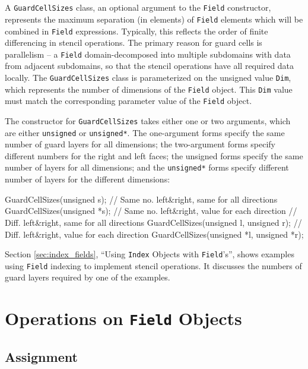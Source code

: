 \section{}

A \texttt{GuardCellSizes} class, an optional argument to the \texttt{Field} constructor, represents the maximum separation (in elements) of \texttt{Field} elements which will be combined in \texttt{Field} expressions. Typically, this reflects the order of finite differencing in stencil operations. The primary reason for guard cells is parallelism -- a \texttt{Field} domain-decomposed into multiple subdomains with data from adjacent subdomains, so that the stencil operations
have all required data locally. The \texttt{GuardCellSizes}
class is parameterized on the unsigned value \texttt{Dim}, which represents the number of dimensions of the \texttt{Field} object. This \texttt{Dim} value must match the corresponding parameter value of the \texttt{Field} object.

The constructor for \texttt{GuardCellSizes} takes either one or two arguments, which are either \texttt{unsigned} or \texttt{unsigned*}. The one-argument forms specify the same number of guard layers for all dimensions; the two-argument forms specify different numbers for the right and left faces; the unsigned forms specify the same number of layers for all dimensions; and the \texttt{unsigned*} forms specify different number of layers for the different dimensions:
\begin{smallcode}
GuardCellSizes(unsigned s);  // Same no. left&right, same for all directions
GuardCellSizes(unsigned *s); // Same no. left&right, value for each direction
// Diff. left&right, same for all directions
GuardCellSizes(unsigned l, unsigned r);
// Diff. left&right, value for each direction
GuardCellSizes(unsigned *l, unsigned *r);
\end{smallcode}

Section \ref{sec:index_fields}, ``Using \texttt{Index} Objects with \texttt{Field}'s'', shows examples using \texttt{Field} indexing to implement stencil operations. It discusses the numbers of guard layers required by one of the examples.

\section{Operations on \texttt{Field} Objects}

\subsection{Assignment}


